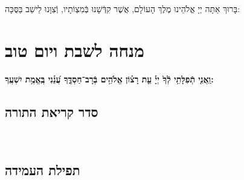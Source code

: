 \documentclass[twoside, openany, parskip=half, 11pt]{book}
\begin{document}
\begin{sometimes}

\\
בָּרוּךְ אַתָּה יְיָ אֱלֹהֵינוּ מֶלֶךְ הָעוֹלָם, אֲשֶׁר קִדְּֿשָׁנוּ בְּֿמִצְוֹתָיו, וְֿצִוָּנוּ לֵישֵׁב בַּסֻּכָּה:


%
\chapter[מנחה לשבת ויום טוב]{ מנחה לשבת ויום טוב }

\ashrei

\uvaletzion

\halfkaddish


\textbf{וַֽאֲנִ֤י תְֿפִלָּתִ֥י לְֿךָ֙ יְיָ֡ עֵ֤ת רָצ֗וֹן אֱלֹהִ֥ים בְּֿרָב־חַסְדֶּ֑ךָ עֲ֝נֵ֗נִי בֶּֽאֱמֶ֥ת יִשְׁעֶֽךָ:} 


\section*{ סדר קריאת התורה }


\pesicha

\gadlu

\avharachamim

\vesigale


\torahbarachu

\hagomel

\nextpage
\hagbaha

\galila

\yehalelu

\\
\kafdalet

\nextpage
\etzchaim


\halfkaddish


\section*{ תפילת העמידה }


\amidaopening{\shabbosshuva}{}



\end{sometimes}
\end{document}
